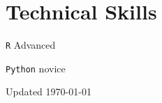\documentclass[12pt,letterpaper]{report}
\newcommand{\listitemspace}{0.15em}
\renewenvironment{itemize}
{\begin{list}{}{\setlength{\leftmargin}{0em}
            \setlength{\parskip}{0em}
            \setlength{\itemsep}{\listitemspace}
            \setlength{\parsep}{\listitemspace}}}
    {\end{list}}
\begin{document}
    \section*{Technical Skills}

    \begin{itemize}

        \item \texttt{R} \tab Advanced
        
        \item \texttt{Python} \tab novice
        
    \end{itemize}

    \begin{center}
        \vfill
        Updated \monthyeardate\today
    \end{center}
\end{document}
